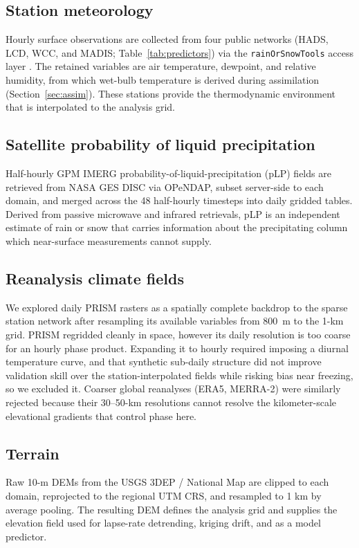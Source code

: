 \documentclass[twocol]{ametsocV6.1} %
\begin{document}
\subsection{Station meteorology}
Hourly surface observations are collected from four public networks
(HADS, LCD, WCC, and MADIS; Table~\ref{tab:predictors}) via the
\texttt{rainOrSnowTools} access layer \citep{rainorsnowtools}. The retained variables are air
temperature, dewpoint, and relative humidity, from which wet-bulb
temperature is derived during assimilation (Section~\ref{sec:assim}).
These stations provide the thermodynamic environment that is
interpolated to the analysis grid.

\subsection{Satellite probability of liquid precipitation}
Half-hourly GPM IMERG probability-of-liquid-precipitation (pLP) fields
\citep{huffman2020imerg} are retrieved from NASA GES DISC via OPeNDAP,
subset server-side to each domain, and merged across the 48
half-hourly timesteps into daily gridded tables. Derived from passive
microwave and infrared retrievals, pLP is an independent estimate of
rain or snow that carries information about the precipitating column
which near-surface measurements cannot supply.

\subsection{Reanalysis climate fields}
\label{sec:reanalysis}
We explored daily PRISM rasters \citep{daly2008} as a spatially
complete backdrop to the sparse station network after resampling its available
variables from 800~m to the 1-km grid. PRISM regridded cleanly in space,
however its daily resolution is too coarse for an hourly phase product. 
Expanding it to hourly required imposing a diurnal temperature
curve, and that synthetic sub-daily structure did not improve validation
skill over the station-interpolated fields while risking bias near
freezing, so we excluded it.
Coarser global reanalyses (ERA5, MERRA-2) were similarly rejected
because their 30--50-km resolutions cannot resolve the kilometer-scale
elevational gradients that control phase here.

\subsection{Terrain}
Raw 10-m DEMs from the USGS 3DEP / National Map are clipped to each
domain, reprojected to the regional UTM CRS, and resampled to 1 km by
average pooling. The resulting DEM defines the analysis grid and supplies
the elevation field used for lapse-rate detrending, kriging drift, and as
a model predictor.
\end{document}
